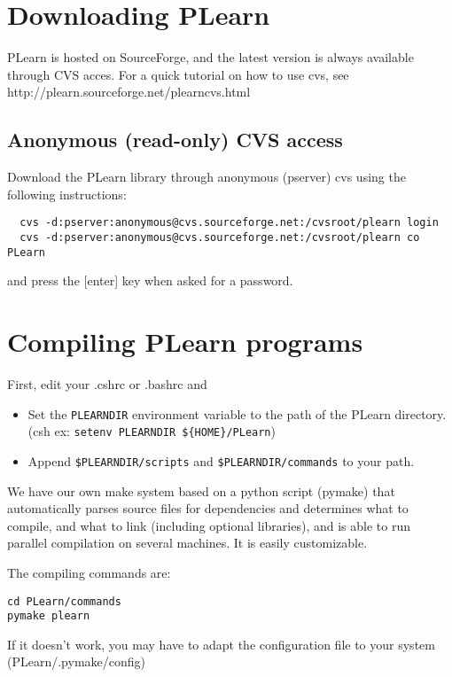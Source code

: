 \documentclass[11pt]{book}
\begin{document}
\section{Downloading PLearn}

PLearn is hosted on SourceForge, and the latest version is always available through CVS acces.
For a quick tutorial on how to use cvs, see http://plearn.sourceforge.net/plearncvs.html


\subsection{Anonymous (read-only) CVS access }

Download the PLearn library through anonymous (pserver) cvs
using the following instructions:

\topsep=0mm
\begin{verbatim}
  cvs -d:pserver:anonymous@cvs.sourceforge.net:/cvsroot/plearn login
  cvs -d:pserver:anonymous@cvs.sourceforge.net:/cvsroot/plearn co PLearn
\end{verbatim}
and press the [enter] key when asked for a password.



\section{Compiling PLearn programs}


First, edit your .cshrc or .bashrc and 
\begin{itemize}
\item Set the {\tt PLEARNDIR} environment variable to the path of the PLearn directory. 
(csh ex: \verb!setenv PLEARNDIR ${HOME}/PLearn!)
\item Append \verb!$PLEARNDIR/scripts! and \verb!$PLEARNDIR/commands! to your path.
\end{itemize}

We have our own make system based on a python script (pymake) that
automatically parses source files for dependencies and determines what to
compile, and what to link (including optional libraries), and is able to
run parallel compilation on several machines.  It is easily
customizable.

The compiling commands are:
\begin{verbatim}
cd PLearn/commands
pymake plearn
\end{verbatim}

If it doesn't work, you may have to adapt the configuration file to your system
(PLearn/.pymake/config)
\end{document}
